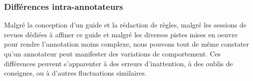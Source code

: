 		\subsubsection{Différences intra-annotateurs}
		\label{section:2.3.3.B-DEFIS-ANNOTATION-ASPECT-HUMAIN-INTRA-ANNOTATEURS}
		
			Malgré la conception d'un guide et la rédaction de règles, malgré les sessions de revues dédiées à affiner ce guide et malgré les diverses pistes mises en oeuvre pour rendre l'annotation moins complexe, nous pouvons tout de même constater qu'un annotateur peut manifester des variations de comportement.
			Ces différences peuvent s'apparenter à des erreurs d’inattention, à des oublis de consignes, ou à d'autres fluctuations similaires.
			
